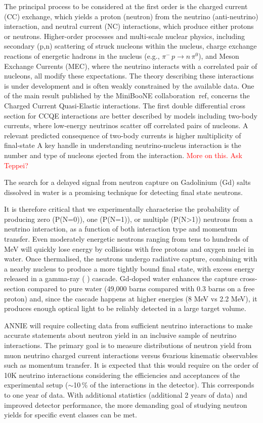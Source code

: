  The principal process to be considered at the first order is the charged current (CC) exchange, %
 which yields a proton (neutron) from the neutrino (anti-neutrino) interaction, %
 and neutral current (NC) interactions, which produce either protons or neutrons. 
 Higher-order processes and multi-scale nuclear physics, including secondary (p,n) scattering %
 of struck nucleons within the nucleus, charge exchange reactions of energetic hadrons %
 in the nucleus (e.g., $\pi^- \, p\rightarrow n \, \pi^0$), and Meson Exchange Currents (MEC), where %
 the neutrino interacts with a correlated pair of nucleons, all modify these expectations.
 The theory describing these interactions is under development and is often weakly constrained %
 by the available data. 
 One of the main result published by the MiniBooNE collaboration~ref, concerns the Charged Current %
 Quasi-Elastic interactions.
 The first double differential cross section for CCQE interactions are better described by models %
 including two-body currents, where low-energy neutrinos scatter off correlated pairs of %
 nucleons.
 A relevant predicted consequence of two-body currents is higher multiplicity of final-state %
 A key handle in understanding neutrino-nucleus interaction is the number and type of nucleons %
 ejected from the interaction.
 \textcolor{red}{More on this. Ask Teppei?}

 The search for a delayed signal from neutron capture on Gadolinium (Gd) salts dissolved in water %
 is a promising technique for detecting final state neutrons.

 It is therefore critical that we experimentally characterise the probability of producing zero %
 (P(N=0)), one (P(N=1)), or multiple (P(N>1)) neutrons from a neutrino interaction, as a function %
 of both interaction type and momentum transfer.
 Even moderately energetic neutrons ranging from tens to hundreds of MeV will quickly lose energy %
 by collisions with free protons and oxygen nuclei in water. 
 Once thermalised, the neutrons undergo radiative capture, combining with a nearby nucleus to %
 produce a more tightly bound final state, with excess energy released in a gamma-ray ( ) cascade. 
 Gd-doped water enhances the capture cross-section compared to pure water %
 (49,000 barns compared with 0.3 barns on a free proton) and, since the cascade happens %
 at higher energies (8 MeV vs 2.2 MeV), it produces enough optical light to be reliably detected in %
 a large target volume.

 ANNIE will require collecting data from sufficient neutrino interactions to make accurate %
 statements about neutron yield in an inclusive sample of neutrino interactions. 
 The primary goal is to measure distributions of neutron yield from muon neutrino charged %
 current interactions versus 6various kinematic observables such as momentum transfer. 
 It is expected that this would require on the order of 10K neutrino interactions considering %
 the efficiencies and acceptances of the experimental setup ($\sim$10\,\% of the interactions %
 in the detector). 
 This corresponds to one year of data. 
 With additional statistics (additional 2 years of data) and improved detector performance, %
 the more demanding goal of studying neutron yields for specific event classes can be met.

